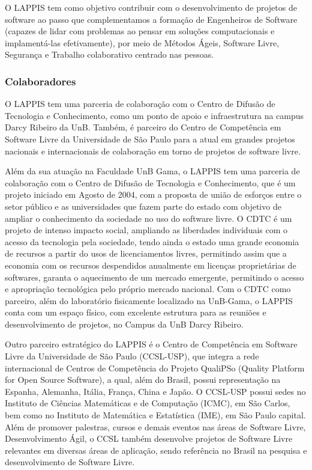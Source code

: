 O LAPPIS tem como objetivo contribuir com o desenvolvimento de projetos de
software ao passo que complementamos a formação de Engenheiros de Software
(capazes de lidar com problemas ao pensar em soluções computacionais e
implamentá-las efetivamente), por meio de Métodos Ágeis, Software Livre,
Segurança e Trabalho colaborativo centrado nas pessoas.

\subsubsection{Colaboradores}
O LAPPIS tem uma parceria de colaboração com o Centro de Difusão de Tecnologia
e Conhecimento, como um ponto de apoio e infraestrutura na campus Darcy
Ribeiro da UnB. Também, é parceiro do Centro de Competência em Software Livre
da Universidade de São Paulo para a atual em grandes projetos nacionais e
internacionais de colaboração em torno de projetos de software livre.


Além da sua atuação na Faculdade UnB Gama, o LAPPIS tem uma parceria de
colaboração com o Centro de Difusão de Tecnologia e Conhecimento, que é
um projeto iniciado em Agosto de 2004, com a proposta de união de
esforços entre o setor público e as universidades que fazem parte do
estado com objetivo de ampliar o conhecimento da sociedade no uso do
software livre. O CDTC é um projeto de intenso impacto social, ampliando
as liberdades individuais com o acesso da tecnologia pela sociedade,
tendo ainda o estado uma grande economia de recursos a partir do usos de
licenciamentos livres, permitindo assim que a economia com os recursos
despendidos anualmente em licenças proprietárias de softwares, garanta o
aquecimento de um mercado emergente, permitindo o acesso e apropriação
tecnológica pelo próprio mercado nacional. Com o CDTC como parceiro,
além do laboratório fisicamente localizado na UnB-Gama, o LAPPIS conta
com um espaço físico, com excelente estrutura para as reuniões e
desenvolvimento de projetos, no Campus da UnB Darcy Ribeiro.

Outro parceiro estratégico do LAPPIS é o Centro de Competência em
Software Livre da Universidade de São Paulo (CCSL-USP), que integra a
rede internacional de Centros de Competência do Projeto QualiPSo
(Quality Platform for Open Source Software), a qual, além do Brasil,
possui representação na Espanha, Alemanha, Itália, França, China e
Japão. O CCSL-USP possui sedes no Instituto de Ciências Matemáticas e de
Computação (ICMC), em São Carlos, bem como no Instituto de Matemática e
Estatística (IME), em São Paulo capital.
%
Além de promover palestras, cursos e demais eventos nas áreas de
Software Livre, Desenvolvimento Ágil, o CCSL também desenvolve projetos
de Software Livre relevantes em diversas áreas de aplicação, sendo
referência no Brasil na pesquisa e desenvolvimento de Software Livre.

